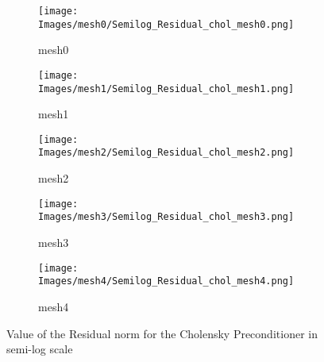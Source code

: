 \begin{figure}[htbp]
    \centering
    \begin{subfigure}{0.45\textwidth}
        \centering
        \texttt{[image: Images/mesh0/Semilog\_Residual\_chol\_mesh0.png]}
        \caption{mesh0}
    \end{subfigure}
    \hfill
    \begin{subfigure}{0.45\textwidth}
        \centering
        \texttt{[image: Images/mesh1/Semilog\_Residual\_chol\_mesh1.png]}
        \caption{mesh1}
    \end{subfigure}
    \hfill
    \begin{subfigure}{0.45\textwidth}
        \centering
        \texttt{[image: Images/mesh2/Semilog\_Residual\_chol\_mesh2.png]}
        \caption{mesh2}
    \end{subfigure}

    \vspace{1em} %

    \begin{subfigure}{0.45\textwidth}
        \centering
        \texttt{[image: Images/mesh3/Semilog\_Residual\_chol\_mesh3.png]}
        \caption{mesh3}
    \end{subfigure}
    \hfill
    \begin{subfigure}{0.45\textwidth}
        \centering
        \texttt{[image: Images/mesh4/Semilog\_Residual\_chol\_mesh4.png]}
        \caption{mesh4}
    \end{subfigure}

    \caption{Value of the Residual norm for the Cholensky Preconditioner in semi-log scale}
    \label{fig: Residual normal cholensky}
\end{figure}


